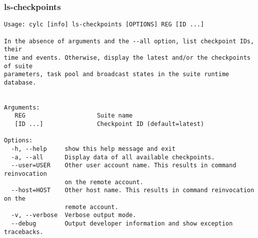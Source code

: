 \subsubsection{ls-checkpoints}
\label{ls-checkpoints}
\begin{lstlisting}
Usage: cylc [info] ls-checkpoints [OPTIONS] REG [ID ...] 

In the absence of arguments and the --all option, list checkpoint IDs, their
time and events. Otherwise, display the latest and/or the checkpoints of suite
parameters, task pool and broadcast states in the suite runtime database.


Arguments:
   REG                    Suite name
   [ID ...]               Checkpoint ID (default=latest)

Options:
  -h, --help     show this help message and exit
  -a, --all      Display data of all available checkpoints.
  --user=USER    Other user account name. This results in command reinvocation
                 on the remote account.
  --host=HOST    Other host name. This results in command reinvocation on the
                 remote account.
  -v, --verbose  Verbose output mode.
  --debug        Output developer information and show exception tracebacks.
\end{lstlisting}
